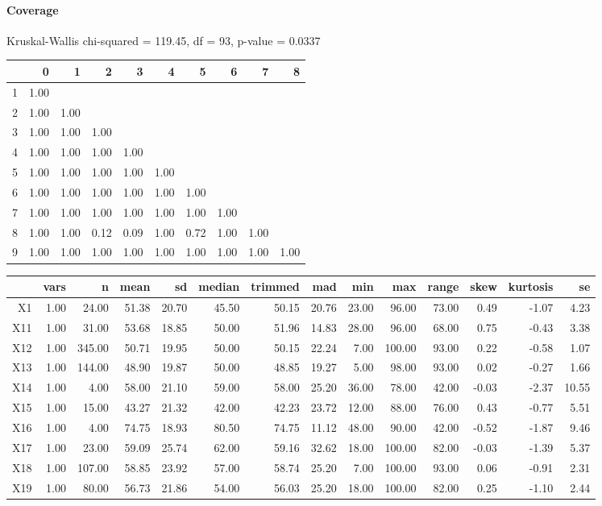 \paragraph{Coverage}
Kruskal-Wallis chi-squared = 119.45, df = 93, p-value = 0.0337

% 
\begin{tabular}{rrrrrrrrrr}
  \hline
 & 0 & 1 & 2 & 3 & 4 & 5 & 6 & 7 & 8 \\ 
  \hline
1 & 1.00 &  &  &  &  &  &  &  &  \\ 
  2 & 1.00 & 1.00 &  &  &  &  &  &  &  \\ 
  3 & 1.00 & 1.00 & 1.00 &  &  &  &  &  &  \\ 
  4 & 1.00 & 1.00 & 1.00 & 1.00 &  &  &  &  &  \\ 
  5 & 1.00 & 1.00 & 1.00 & 1.00 & 1.00 &  &  &  &  \\ 
  6 & 1.00 & 1.00 & 1.00 & 1.00 & 1.00 & 1.00 &  &  &  \\ 
  7 & 1.00 & 1.00 & 1.00 & 1.00 & 1.00 & 1.00 & 1.00 &  &  \\ 
  8 & 1.00 & 1.00 & 0.12 & 0.09 & 1.00 & 0.72 & 1.00 & 1.00 &  \\ 
  9 & 1.00 & 1.00 & 1.00 & 1.00 & 1.00 & 1.00 & 1.00 & 1.00 & 1.00 \\ 
   \hline
\end{tabular}
% 
\begin{tabular}{rrrrrrrrrrrrrr}
  \hline
 & vars & n & mean & sd & median & trimmed & mad & min & max & range & skew & kurtosis & se \\ 
  \hline
X1 & 1.00 & 24.00 & 51.38 & 20.70 & 45.50 & 50.15 & 20.76 & 23.00 & 96.00 & 73.00 & 0.49 & -1.07 & 4.23 \\ 
  X11 & 1.00 & 31.00 & 53.68 & 18.85 & 50.00 & 51.96 & 14.83 & 28.00 & 96.00 & 68.00 & 0.75 & -0.43 & 3.38 \\ 
  X12 & 1.00 & 345.00 & 50.71 & 19.95 & 50.00 & 50.15 & 22.24 & 7.00 & 100.00 & 93.00 & 0.22 & -0.58 & 1.07 \\ 
  X13 & 1.00 & 144.00 & 48.90 & 19.87 & 50.00 & 48.85 & 19.27 & 5.00 & 98.00 & 93.00 & 0.02 & -0.27 & 1.66 \\ 
  X14 & 1.00 & 4.00 & 58.00 & 21.10 & 59.00 & 58.00 & 25.20 & 36.00 & 78.00 & 42.00 & -0.03 & -2.37 & 10.55 \\ 
  X15 & 1.00 & 15.00 & 43.27 & 21.32 & 42.00 & 42.23 & 23.72 & 12.00 & 88.00 & 76.00 & 0.43 & -0.77 & 5.51 \\ 
  X16 & 1.00 & 4.00 & 74.75 & 18.93 & 80.50 & 74.75 & 11.12 & 48.00 & 90.00 & 42.00 & -0.52 & -1.87 & 9.46 \\ 
  X17 & 1.00 & 23.00 & 59.09 & 25.74 & 62.00 & 59.16 & 32.62 & 18.00 & 100.00 & 82.00 & -0.03 & -1.39 & 5.37 \\ 
  X18 & 1.00 & 107.00 & 58.85 & 23.92 & 57.00 & 58.74 & 25.20 & 7.00 & 100.00 & 93.00 & 0.06 & -0.91 & 2.31 \\ 
  X19 & 1.00 & 80.00 & 56.73 & 21.86 & 54.00 & 56.03 & 25.20 & 18.00 & 100.00 & 82.00 & 0.25 & -1.10 & 2.44 \\ 
   \hline
\end{tabular}
